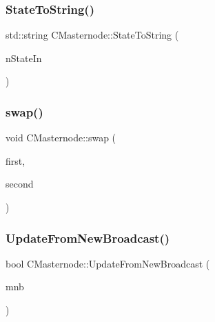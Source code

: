 \mbox{\label{class_c_masternode_a379321e692aaabfce4ebffc1e54e0d39}} 
\subsubsection{\texorpdfstring{State\+To\+String()}{StateToString()}}
{\footnotesize\ttfamily std\+::string C\+Masternode\+::\+State\+To\+String (\begin{DoxyParamCaption}\item[{int}]{n\+State\+In }\end{DoxyParamCaption})\hspace{0.3cm}{\ttfamily [static]}}

\mbox{\label{class_c_masternode_a8cad9a9fa0b7afe75ba20254d7790b61}} 
\subsubsection{\texorpdfstring{swap()}{swap()}}
{\footnotesize\ttfamily void C\+Masternode\+::swap (\begin{DoxyParamCaption}\item[{\mbox{\hyperlink{class_c_masternode}{C\+Masternode}} \&}]{first,  }\item[{\mbox{\hyperlink{class_c_masternode}{C\+Masternode}} \&}]{second }\end{DoxyParamCaption})\hspace{0.3cm}{\ttfamily [inline]}}

\mbox{\label{class_c_masternode_a96da6f523ec3a160239c966bf0dcf876}} 
\subsubsection{\texorpdfstring{Update\+From\+New\+Broadcast()}{UpdateFromNewBroadcast()}}
{\footnotesize\ttfamily bool C\+Masternode\+::\+Update\+From\+New\+Broadcast (\begin{DoxyParamCaption}\item[{\mbox{\hyperlink{class_c_masternode_broadcast}{C\+Masternode\+Broadcast}} \&}]{mnb }\end{DoxyParamCaption})}

